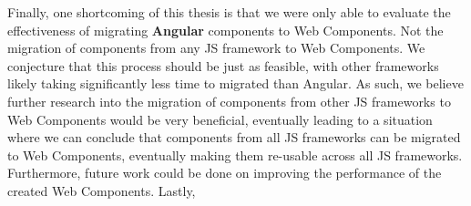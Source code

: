 Finally, one shortcoming of this thesis is that we were only able to evaluate the effectiveness of migrating \textbf{Angular} components to Web Components. Not the migration of components from any JS framework to Web Components. We conjecture that this process should be just as feasible, with other frameworks likely taking significantly less time to migrated than Angular. As such, we believe further research into the migration of components from other JS frameworks to Web Components would be very beneficial, eventually leading to a situation where we can conclude that components from all JS frameworks can be migrated to Web Components, eventually making them re-usable across all JS frameworks. Furthermore, future work could be done on improving the performance of the created Web Components. Lastly,